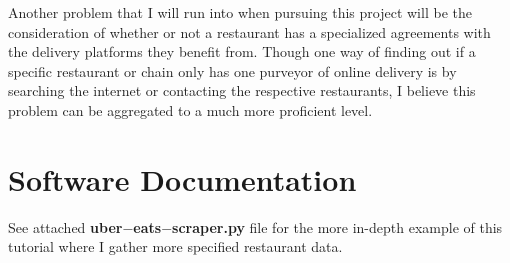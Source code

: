 \documentclass[10pt,twocolumn]{article}
\begin{document}
Another problem that I will run into when pursuing this project will be the consideration of whether or not a restaurant has a specialized agreements with the delivery platforms they benefit from. Though one way of finding out if a specific restaurant or chain only has one purveyor of online delivery is by searching the internet or contacting the respective restaurants, I believe this problem can be aggregated to a much more proficient level.

\section{Software Documentation}

See attached \textbf{uber$-$eats$-$scraper.py} file for the more in-depth example of this tutorial where I gather more specified restaurant data.

\printbibliography 
\end{document}
